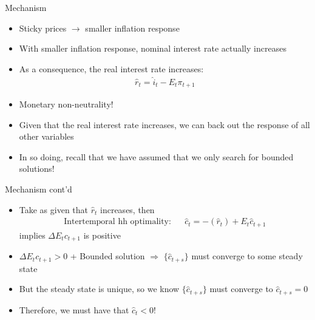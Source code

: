 \documentclass[9pt,xcolor={dvipsnames}]{beamer}
\newcommand{\bit}{\begin{itemize}}
\newcommand{\eit}{\end{itemize}}
\newcommand{\bc}{\color{blue}}
\begin{document}
\begin{frame}{Mechanism}

\bit
\setlength\itemsep{1em}
\item Sticky prices $\rightarrow$ smaller inflation response

\item With smaller inflation response, nominal interest rate actually increases

\item As a consequence, the real interest rate increases:
\begin{eqnarray}
\hat r_t = \hat i_t - E_t \pi_{t+1} \nonumber
\end{eqnarray}

\item {\bc Monetary non-neutrality!}

\item Given that the real interest rate increases, we can back out the response of all other variables

\item In so doing, recall that we have assumed that we only search for bounded solutions!


\eit



\end{frame}


\begin{frame}{Mechanism cont'd}

\bit
\setlength\itemsep{1em}
\item Take as given that $\hat r_t$ increases, then
\begin{eqnarray}
\text{Intertemporal hh optimality:} && \hat c_t =  - (\hat r_t) + E_t \hat c_{t+1} \nonumber
\end{eqnarray}
implies $\Delta E_t c_{t+1}$ is positive

\item $\Delta E_t c_{t+1}>0$ + Bounded solution $\Rightarrow$ $\{\hat c_{t+s}\}$ must converge to some steady state

\item But the steady state is unique, so we know $\{\hat c_{t+s}\}$ must converge to $\hat c_{t+s}=0$

\item Therefore, we must have that $\hat c_t<0$!

\eit


\end{frame}
\end{document}

